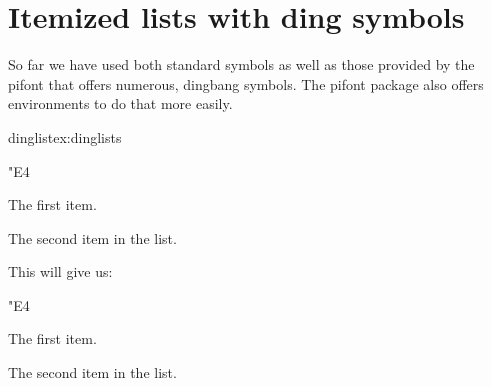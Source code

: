 %
%
%


\section{Itemized lists with ding symbols}

So far we have used both standard symbols as well as those provided by the pifont that offers numerous,
dingbang symbols. The pifont package also offers environments to do that more easily.


\begin{texcode}{dinglist}{ex:dinglists}
\begin{dinglist}{"E4}
\item The first item. \item The second
item in the list.
\end{dinglist}

\end{texcode}

This will give us:

\begin{dinglist}{"E4}
\item The first item. \item The second
item in the list.
\end{dinglist}



